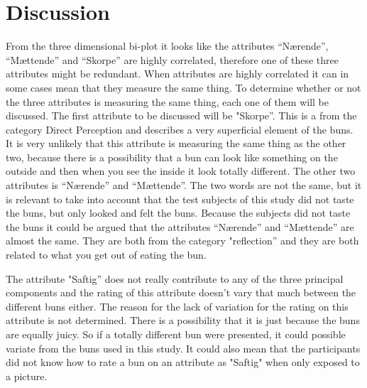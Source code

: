 \section*{Discussion}
\label{discussion}
%
From the three dimensional bi-plot it looks like the attributes “Nærende”, “Mættende” and “Skorpe” are highly correlated, therefore one of these three attributes might be redundant. 
When attributes are highly correlated it can in some cases mean that they measure the same thing. To determine whether or not the three attributes is measuring the same thing, each one of them will be discussed. \blankline
%
The first attribute to be discussed will be "Skorpe''. This is a from the category Direct Perception and describes a very superficial element of the buns. It is very unlikely that this attribute is measuring the same thing as the other two, because there is a possibility that a bun can look like something on the outside and then when you see the inside it look totally different. \blankline
%
The other two attributes is “Nærende” and “Mættende”. The two words are not the same, but it is relevant to take into account that the test subjects of this study did not taste the buns, but only looked and felt the buns. Because the subjects did not taste the buns it could be argued that the attributes “Nærende” and “Mættende” are almost the same. They are both from the category "reflection'' and they are both related to what you get out of eating the bun. \blankline

The attribute "Saftig'' does not really contribute to any of the three principal components and the rating of this attribute doesn't vary that much between the different buns either. The reason for the lack of variation for the rating on this attribute is not determined. There is a possibility that it is just because the buns are equally juicy. So if a totally different bun were presented, it could possible variate from the buns used in this study. It could also mean that the participants did not know how to rate a bun on an attribute as "Saftig" when only exposed to a picture.